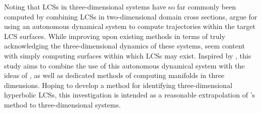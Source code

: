 Noting that LCSs in three-dimensional systems have so far commonly been computed by combining LCSs in two-dimensional domain cross sections, \cite{Oettinger} argue for using an autonomous dynamical system to compute trajectories within the target LCS surfaces. While improving upon existing methods in terms of truly acknowledging the three-dimensional dynamics of these systems, \cite{Oettinger} seem content with simply computing surfaces within which LCSs may exist. Inspired by \cite{Oettinger}, this study aims to combine the use of this autonomous dynamical system with the ideas of \cite{Haller14}, as well as dedicated methods of computing manifolds in three dimensions. Hoping to develop a method for identifying three-dimensional hyperbolic LCSs, this investigation is intended as a reasonable extrapolation of \cite{Haller12}'s method to three-dimensional systems.








